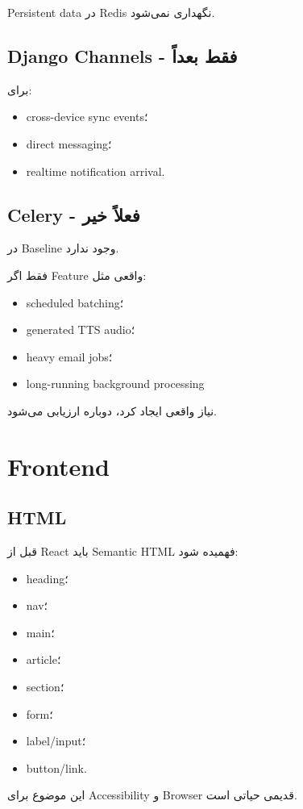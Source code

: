 Persistent data در Redis نگهداری نمی‌شود.

\subsection{Django Channels - فقط بعداً}

برای:
\begin{itemize}
  \item cross-device sync events؛
  \item direct messaging؛
  \item realtime notification arrival.
\end{itemize}

\subsection{Celery - فعلاً خیر}

در Baseline وجود ندارد.

فقط اگر Feature واقعی مثل:
\begin{itemize}
  \item scheduled batching؛
  \item generated TTS audio؛
  \item heavy email jobs؛
  \item long-running background processing
\end{itemize}
نیاز واقعی ایجاد کرد، دوباره ارزیابی می‌شود.

\section{Frontend}

\subsection{HTML}

قبل از React باید Semantic HTML فهمیده شود:
\begin{itemize}
  \item heading؛
  \item nav؛
  \item main؛
  \item article؛
  \item section؛
  \item form؛
  \item label/input؛
  \item button/link.
\end{itemize}

این موضوع برای Accessibility و Browser قدیمی حیاتی است.

